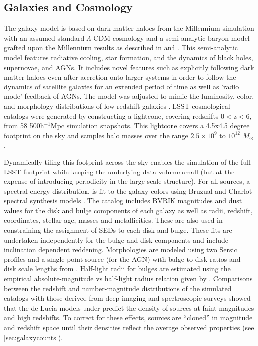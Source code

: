 \documentclass[]{article}
\begin{document}
{\subsection{Galaxies and Cosmology \label{sec:gal}}

The galaxy model is based on dark matter haloes from the Millennium
simulation \citep{springel05} with an assumed standard $\Lambda$-CDM
cosmology and a semi-analytic baryon model grafted upon the Millennium
results as described in \citet{springel05} and \citet{delucia}. This
semi-analytic model features radiative cooling, star formation, and
the dynamics of black holes, supernovae, and AGNs. It includes
novel features such as explicitly following dark matter haloes even
after accretion onto larger systems in order to follow the dynamics of
satellite galaxies for an extended period of time as well as 'radio
mode' feedback of AGNs. The model was adjusted to mimic the
luminosity, color, and morphology distributions of low redshift
galaxies \citep{delucia}. LSST cosmological catalogs were generated
by constructing a lightcone, covering redshifts 0$<$z$<$6, from 58
500h$^{-1}$Mpc simulation snapshots. This lightcone covers a 4.5x4.5
degree footprint on the sky and samples halo masses over the range
$2.5\times10^9$ to $10^{12}$ $M_\odot$. 

Dynamically tiling this footprint across the sky enables the
simulation of the full LSST footprint while keeping the underlying
data volume small (but at the expense of introducing periodicity in
the large scale structure).  For all sources, a spectral energy
distribution, is fit to the galaxy colors using Bruzual and Charlot
spectral synthesis models \citep{bruzual}. The
\citet{delucia} catalog includes BVRIK magnitudes and dust values for
the disk and bulge components of each galaxy as well as radii,
redshift, coordinates, stellar age, masses and metallicities. These
are also used in constraining the assignment of SEDs to each disk and bulge.
These fits are undertaken independently for the bulge and disk components and
include inclination dependent reddening. Morphologies are modeled using two
Sersic profiles and a single point source (for the AGN) with
bulge-to-disk ratios and disk scale lengths from \citet{delucia}.
 Half-light radii for bulges are estimated using the empirical
absolute-magnitude vs half-light radius relation given by 
\citet{gonzalez09}.  Comparisons between the redshift and
number-magnitude distributions of the simulated catalogs with those
derived from deep imaging and spectroscopic surveys showed that the de
Lucia models under-predict the density of sources at faint magnitudes
and high redshifts. To correct for these effects, sources are
``cloned'' in magnitude and redshift space until their densities
reflect the average observed properties (see
\ref{sec:galaxycounts}). 

}
\end{document}
